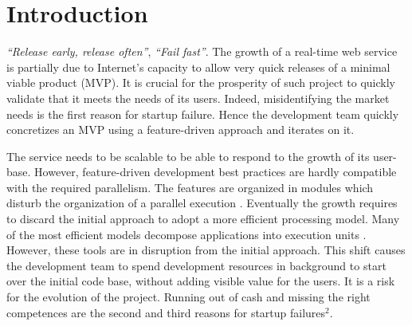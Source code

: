 \section{Introduction}

\textit{``Release early, release often''}, \textit{``Fail fast''}.
The growth of a real-time web service is partially due to Internet's capacity to allow very quick releases of a minimal viable product (MVP).
It is crucial for the prosperity of such project to quickly validate that it meets the needs of its users.
Indeed, misidentifying the market needs is the first reason for startup failure.
Hence the development team quickly concretizes an MVP using a feature-driven approach and iterates on it.

The service needs to be scalable to be able to respond to the growth of its user-base.
However, feature-driven development best practices are hardly compatible with the required parallelism.
The features are organized in modules which disturb the organization of a parallel execution \cite{Clements2013a,Hughes1989,Parnas1972}.
Eventually the growth requires to discard the initial approach to adopt a more efficient processing model.
Many of the most efficient models decompose applications into execution units \cite{Fox1997, Welsh2000, Dean2008}.
However, these tools are in disruption from the initial approach.
This shift causes the development team to spend development resources in background to start over the initial code base, without adding visible value for the users.
It is a risk for the evolution of the project.
Running out of cash and missing the right competences are the second and third reasons for startup failures$^2$.

